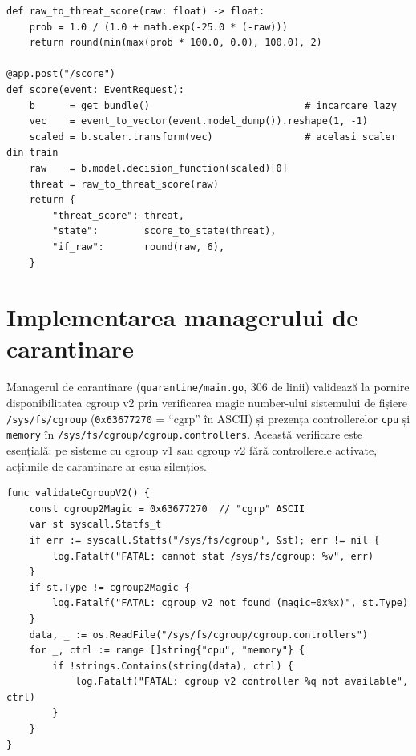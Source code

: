 \begin{lstlisting}[style=pythonstyle,caption={Transformarea sigmoidă și endpoint-ul \texttt{/score}}]
def raw_to_threat_score(raw: float) -> float:
    prob = 1.0 / (1.0 + math.exp(-25.0 * (-raw)))
    return round(min(max(prob * 100.0, 0.0), 100.0), 2)

@app.post("/score")
def score(event: EventRequest):
    b      = get_bundle()                           # incarcare lazy
    vec    = event_to_vector(event.model_dump()).reshape(1, -1)
    scaled = b.scaler.transform(vec)                # acelasi scaler din train
    raw    = b.model.decision_function(scaled)[0]
    threat = raw_to_threat_score(raw)
    return {
        "threat_score": threat,
        "state":        score_to_state(threat),
        "if_raw":       round(raw, 6),
    }
\end{lstlisting}


\section{Implementarea managerului de carantinare}
\label{sec:quarantine_impl}

\par Managerul de carantinare (\texttt{quarantine/main.go}, 306 de linii) validează la pornire disponibilitatea cgroup v2 prin verificarea magic number-ului sistemului de fișiere \texttt{/sys/fs/cgroup} (\texttt{0x63677270} = ``cgrp'' în ASCII) și prezența controllerelor \texttt{cpu} și \texttt{memory} în \texttt{/sys/fs/cgroup/cgroup.controllers}. Această verificare este esențială: pe sisteme cu cgroup v1 sau cgroup v2 fără controllerele activate, acțiunile de carantinare ar eșua silențios.

\begin{lstlisting}[style=gostyle,caption={Validarea cgroup v2 la pornirea managerului de carantinare}]
func validateCgroupV2() {
    const cgroup2Magic = 0x63677270  // "cgrp" ASCII
    var st syscall.Statfs_t
    if err := syscall.Statfs("/sys/fs/cgroup", &st); err != nil {
        log.Fatalf("FATAL: cannot stat /sys/fs/cgroup: %v", err)
    }
    if st.Type != cgroup2Magic {
        log.Fatalf("FATAL: cgroup v2 not found (magic=0x%x)", st.Type)
    }
    data, _ := os.ReadFile("/sys/fs/cgroup/cgroup.controllers")
    for _, ctrl := range []string{"cpu", "memory"} {
        if !strings.Contains(string(data), ctrl) {
            log.Fatalf("FATAL: cgroup v2 controller %q not available", ctrl)
        }
    }
}
\end{lstlisting}

